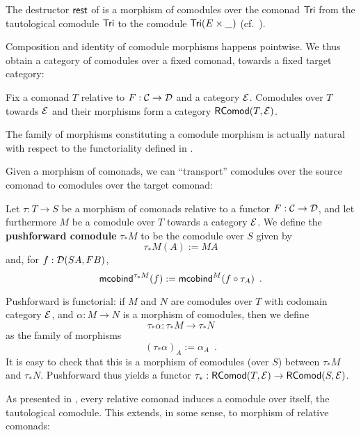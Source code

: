 \documentclass{amsart}
\newcommand{\fat}[1]{\textbf{#1}}
\begin{document}
\begin{example}\label{ex:tail_comodule}
 The destructor $\tail$ of  is a morphism of comodules over the comonad $\Tri$ 
  from the tautological comodule  $\Tri$ to the comodule $\Tri(E\times \_)$ (cf.\ ).
\end{example}

Composition and identity of comodule morphisms happens pointwise. We thus obtain a category of comodules
over a fixed comonad, towards a fixed target category:

\begin{remark}
 Fix a comonad $T$ relative to $F:\C\to\D$ and a category $\E$.
 Comodules over $T$ towards $\E$ and their morphisms  form a category $\RComod(T,\E)$.
\end{remark}



\begin{remark}
  The family of morphisms constituting a comodule morphism is actually natural with respect to the functoriality 
  defined in .
\end{remark}

Given a morphism of comonads, we can \enquote{transport} comodules over the source comonad to comodules over the target comonad:


\begin{definition}\label{def:pushforward_comodule} %
  Let $\tau : T\to S$ be a morphism of comonads relative to a functor $F : \C \to \D$, and let furthermore $M$ be a 
  comodule over $T$ towards a category $\E$. We define the \fat{pushforward comodule} $\tau_*M$ to be the comodule over $S$ given by
  \[  \tau_*M(A) := MA \]
  and, for $f : \D(SA,FB)$,
   \[ \mcobind^{\tau_*M}(f) := \mcobind^M(\comp{\tau_A}{f}) \enspace . \]
   
  \noindent
  Pushforward is functorial: if $M$ and $N$ are comodules over $T$ with codomain category $\E$, and $\alpha : M\to N$ is 
    a morphism of comodules, then we define \[\tau_*\alpha : \tau_*M \to \tau_*N\] 
    as the family of morphisms
     \[ (\tau_*\alpha)_A := \alpha_A \enspace . \]
  It is easy to check that this is a morphism of comodules (over $S$) between $\tau_*M$ and $\tau_*N$.
  Pushforward thus yields a functor $\tau_*:\RComod(T,\E) \to \RComod(S,\E)$.
\end{definition}


As presented in , every relative comonad induces a comodule over itself, the tautological comodule.
This extends, in some sense, to morphism of relative comonads:
\end{document}
